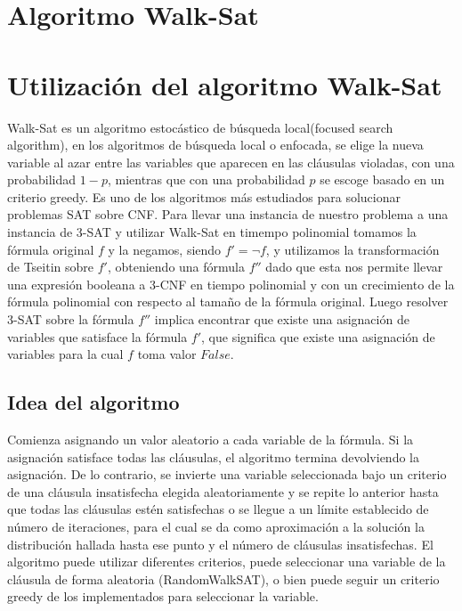 \documentclass[article]{llncs}
\begin{document}
\section{Algoritmo Walk-Sat}


\section{Utilización del algoritmo Walk-Sat}

Walk-Sat es un algoritmo estocástico de búsqueda local(focused search algorithm), en los algoritmos de búsqueda local o enfocada, se elige la nueva 
variable al azar entre las variables que aparecen en las cláusulas violadas, con una probabilidad $1-p$, mientras que con una probabilidad $p$
 se escoge basado en un criterio greedy. Es uno de los algoritmos más estudiados para solucionar problemas SAT sobre CNF.
Para llevar una instancia de nuestro problema a una instancia de 3-SAT y utilizar Walk-Sat en timempo polinomial tomamos la fórmula original 
$f$ y la negamos, siendo $f' = \lnot f$, y utilizamos la transformación de Tseitin sobre $f'$, obteniendo una fórmula $f''$ dado que esta
nos permite llevar una expresión booleana a 3-CNF en tiempo polinomial y con un crecimiento de la fórmula polinomial con
respecto al tamaño de la fórmula original. Luego resolver 3-SAT sobre la fórmula $f''$ implica encontrar que existe una asignación de
variables que satisface la fórmula $f'$, que significa que existe una asignación de variables para la cual $f$ toma valor $False$.

\subsection{Idea del algoritmo}

Comienza asignando un valor aleatorio a cada variable de la fórmula. Si la asignación satisface todas las cláusulas, 
el algoritmo termina devolviendo la asignación. De lo contrario, se invierte una variable seleccionada bajo un criterio de
una cláusula insatisfecha elegida aleatoriamente y se repite lo anterior hasta que todas las cláusulas estén satisfechas o se llegue a
un límite establecido de número de iteraciones, para el cual se da como aproximación a la solución la distribución hallada hasta ese punto 
y el número de cláusulas insatisfechas. El algoritmo puede utilizar diferentes criterios, puede seleccionar una variable de la cláusula de 
forma aleatoria (RandomWalkSAT), o bien puede seguir un criterio greedy de los implementados para seleccionar la variable.
\end{document}
